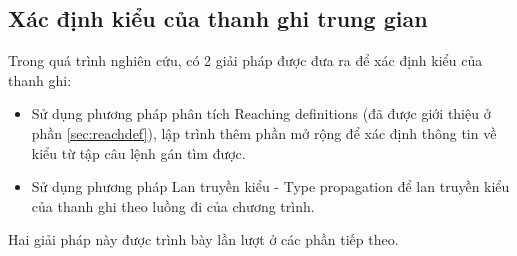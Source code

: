 \subsection{Xác định kiểu của thanh ghi trung gian}
Trong quá trình nghiên cứu, có 2 giải pháp được đưa ra để xác định kiểu của thanh ghi:
\begin{itemize}
	\item Sử dụng phương pháp phân tích Reaching definitions (đã được giới thiệu ở phần \ref{sec:reachdef}), lập trình thêm phần mở rộng để xác định thông tin về kiểu từ tập câu lệnh gán tìm được.
	\item Sử dụng phương pháp Lan truyền kiểu - Type propagation để lan truyền kiểu của thanh ghi theo luồng đi của chương trình.
\end{itemize}
Hai giải pháp này được trình bày lần lượt ở các phần tiếp theo.
